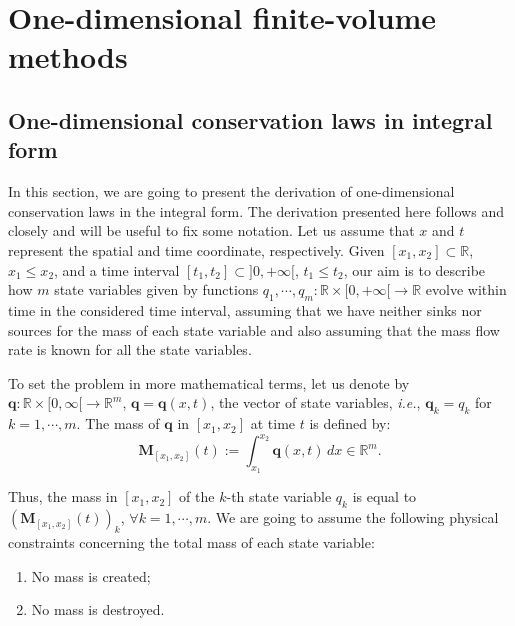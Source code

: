 
\chapter{One-dimensional finite-volume methods}
\label{chp1-1d-fv}
\section{One-dimensional conservation laws in integral form}
\label{chp1-sec1}
In this section, we are going to present the derivation of one-dimensional conservation
laws in the integral form. 
The derivation presented here follows \citet{leveque:1990} and \citet{leveque:2002} closely and will
be useful to fix some notation. 
Let us assume that $x$ and $t$ represent the spatial and time coordinate, respectively.
Given $[x_1, x_2] \subset \mathbb{R}$, $x_1 \leq x_2$, and a time 
interval $[t_1, t_2] \subset ]0, +\infty[$, $t_1 \leq t_2$, 
our aim is to describe how $m$ state variables given by functions 
$q_1, \cdots, q_m: \mathbb{R}\times[0, +\infty[ \to \mathbb{R}$ 
evolve within time in the considered time interval, assuming that we have neither sinks nor sources 
for the mass of each state variable and also assuming that the mass
flow rate is known for all the state variables.

To set the problem in more mathematical terms, let us denote by 
$\mathbf{q}: \mathbb{R}\times [0, \infty[\to \mathbb{R}^m$, 
$\mathbf{q} = \mathbf{q}(x,t)$, the vector of state variables,
\textit{i.e.}, $\mathbf{q}_k = q_k$ for $k=1, \cdots, m$.
The mass of $\mathbf{q}$ in $[x_1, x_2]$ at time $t$ is defined by:
\begin{equation}
	\label{chp1-sec1-eq1}
	\mathbf{M}_{[x_1, x_2]}(t) := \int_{x_1}^{x_2} \mathbf{q}(x,t) \,dx \in \mathbb{R}^m.
\end{equation}

Thus, the mass in $[x_1, x_2]$ of the $k$-th state variable $q_k$ is equal to
$(\mathbf{M}_{[x_1, x_2]}(t))_k$, $\forall k = 1, \cdots, m$.
We are going to assume the following physical constraints concerning the total mass of each state variable:
\begin{enumerate}
	\item No mass is created;
	\item No mass is destroyed.
\end{enumerate}

